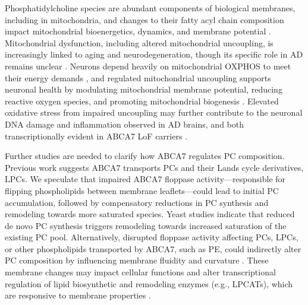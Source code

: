 Phosphatidylcholine species are abundant components of biological membranes, including in mitochondria, and changes to their fatty acyl chain composition impact mitochondrial bioenergetics, dynamics, and membrane potential \supercite{Decker2024-ae,Wang2019-om,Van_der_Veen2017-ei,Adachi2016-tg}. Mitochondrial dysfunction, including altered mitochondrial uncoupling, is increasingly linked to aging and neurodegeneration, though its specific role in AD remains unclear \supercite{Bano2023-qz,Zong2024-tn,Demine2019-qj,Picca2023-gt}. Neurons depend heavily on mitochondrial OXPHOS to meet their energy demands \supercite{Morant-Ferrando2023-va,Trigo2022-ym}, and regulated mitochondrial uncoupling supports neuronal health by modulating mitochondrial membrane potential, reducing reactive oxygen species, and promoting mitochondrial biogenesis \supercite{Park2023-fa,Demine2019-qj,Shadel2015-kt,Korshunov1997-aj,Wisloff2005-ho,Andrews2005-yy}. Elevated oxidative stress from impaired uncoupling may further contribute to the neuronal DNA damage and inflammation observed in AD brains, and both transcriptionally evident in ABCA7 LoF carriers \supercite{Robert2020-sc,Volanti2002-mc,Canty1999-oj,Schreck1992-zr}. 

Further studies are needed to clarify how ABCA7 regulates PC composition. Previous work suggests ABCA7 transports PCs and their Lands cycle derivatives, LPCs. We speculate that impaired ABCA7 floppase activity—responsible for flipping phospholipids between membrane leaflets—could lead to initial PC accumulation, followed by compensatory reductions in PC synthesis and remodeling towards more saturated species. Yeast studies indicate that reduced de novo PC synthesis triggers remodeling towards increased saturation of the existing PC pool. Alternatively, disrupted floppase activity affecting PCs, LPCs, or other phospholipids transported by ABCA7, such as PE, could indirectly alter PC composition by influencing membrane fluidity and curvature \supercite{Takada2018-ce,Renne2018-fc}. These membrane changes may impact cellular functions \supercite{McMahon2015-gy,Yang2024-tz} and alter transcriptional regulation of lipid biosynthetic and remodeling enzymes (e.g., LPCATs), which are responsive to membrane properties \supercite{Ballweg2020-rv,Covino2018-hz}.

